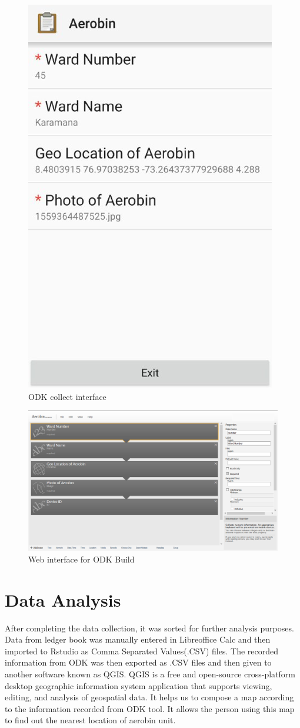 \documentclass[12pt,a4paper]{  report}
\begin{document}
\begin{figure}
	\centering
	\includegraphics[width=0.5\linewidth]{odk}
	\caption{ODK collect interface}
	\label{fig:odk}
\end{figure}	

\begin{figure}
	\centering
	\includegraphics[width=1\linewidth]{ODKbuild}
	\caption{Web interface for ODK Build}
	\label{fig:odkbuild}
\end{figure}	

\chapter{\textbf{Data Analysis}}
After completing the data collection, it was sorted for further analysis purposes. Data from ledger book was manually entered in Libreoffice Calc and then imported to Rstudio as Comma Separated Values(.CSV) files. The recorded information from ODK was then exported as .CSV files and then given to another software known as QGIS. QGIS is a free and open-source cross-platform desktop geographic information system application that supports viewing, editing, and analysis of geospatial data. It helps us to compose a map according to the information recorded from ODK tool. It allows the person using this map to find out the nearest location of aerobin unit.
\end{document}
